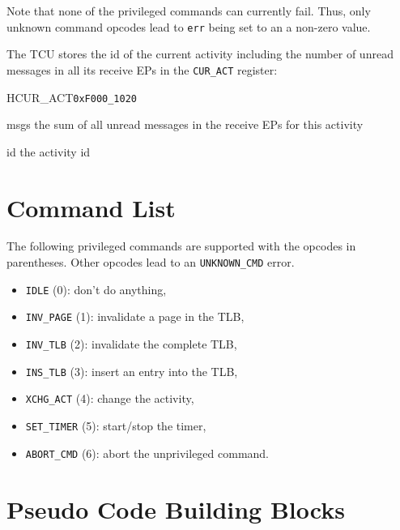 \noindent Note that none of the privileged commands can currently fail. Thus, only unknown command
opcodes lead to \texttt{err} being set to an a non-zero value.

\noindent The TCU stores the id of the current activity including the number of unread messages in all
its receive EPs in the \texttt{CUR\_ACT} register:

\setlength{\regWidth}{.95\textwidth}
\begin{register}{H}{CUR\_ACT}{\texttt{0xF000\_1020}}
  \regnewline%
  \begin{regdesc}\begin{reglist}
    \item[msgs] the sum of all unread messages in the receive EPs for this activity
    \item[id] the activity id
  \end{reglist}\end{regdesc}
\end{register}
\setlength{\regWidth}{\textwidth}
\extend{}

\section{Command List}

The following privileged commands are supported with the opcodes in parentheses. Other opcodes lead
to an \texttt{UNKNOWN\_CMD} error.

\begin{itemize}
  \item \texttt{IDLE} (0):  don't do anything, \extend{}
  \item \texttt{INV\_PAGE} (1): invalidate a page in the TLB, 
  \item \texttt{INV\_TLB} (2): invalidate the complete TLB,
  \item \texttt{INS\_TLB} (3): insert an entry into the TLB, \extend{}
  \item \texttt{XCHG\_ACT} (4): change the activity, 
  \item \texttt{SET\_TIMER} (5): start/stop the timer,
  \item \texttt{ABORT\_CMD} (6): abort the unprivileged command. \extend{}
\end{itemize}

\section{Pseudo Code Building Blocks}

